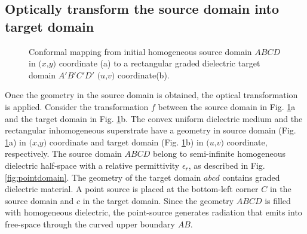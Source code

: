 \subsection{Optically transform the source domain into target domain} \label{sourtotargettrans}
\begin{figure} [t!]
\centering
  \noindent
\hspace*{\fill}%
	\noindent
	\mbox{}
\hspace*{\fill}%
  \mbox{}
	  \hspace*{\fill}%
    \caption[The initial conformal mapping from a homogeneous source domain to rectangular graded dielectric target domain.]{Conformal mapping from initial homogeneous source domain $ABCD$ in $(x$,$y)$ coordinate (a) to a rectangular graded dielectric target domain $A'B'C'D'$ $(u$,$v)$ coordinate(b).}
\label{fig:pointuncomp}
\end{figure}

Once the geometry in the source domain is obtained, the optical transformation is applied. Consider the transformation $f$ between the source domain in Fig. \ref{fig:pointuncomp}a and the target domain in Fig. \ref{fig:pointuncomp}b. The convex uniform dielectric medium and the rectangular inhomogeneous superstrate have a geometry in source domain (Fig. \ref{fig:pointuncomp}a) in $(x$,$y)$ coordinate and target domain (Fig. \ref{fig:pointuncomp}b) in $(u$,$v)$ coordinate, respectively. The source domain $ABCD$ belong to semi-infinite homogeneous dielectric half-space with a relative permittivity $\epsilon_r$, as described in Fig. \ref{fig:pointdomain}. The geometry of the target domain $abcd$ contains graded dielectric material. A point source is placed at the bottom-left corner $C$ in the source domain and $c$ in the target domain. Since the geometry $ABCD$ is filled with homogeneous dielectric, the point-source generates radiation that emits into free-space through the curved upper boundary $AB$. 

